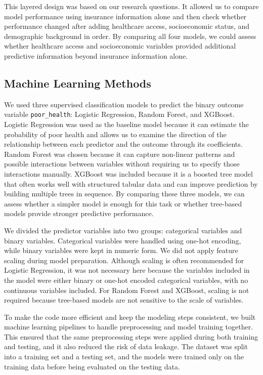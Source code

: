 This layered design was based on our research questions. It allowed us to compare model performance using insurance information alone and then check whether performance changed after adding healthcare access, socioeconomic status, and demographic background in order. By comparing all four models, we could assess whether healthcare access and socioeconomic variables provided additional predictive information beyond insurance information alone.

\subsection{Machine Learning Methods}
We used three supervised classification models to predict the binary outcome variable \texttt{poor\_health}: Logistic Regression, Random Forest, and XGBoost. Logistic Regression was used as the baseline model because it can estimate the probability of poor health and allows us to examine the direction of the relationship between each predictor and the outcome through its coefficients. Random Forest was chosen because it can capture non-linear patterns and possible interactions between variables without requiring us to specify those interactions manually. XGBoost was included because it is a boosted tree model that often works well with structured tabular data and can improve prediction by building multiple trees in sequence. By comparing these three models, we can assess whether a simpler model is enough for this task or whether tree-based models provide stronger predictive performance.

We divided the predictor variables into two groups: categorical variables and binary variables. Categorical variables were handled using one-hot encoding, while binary variables were kept in numeric form. We did not apply feature scaling during model preparation. Although scaling is often recommended for Logistic Regression, it was not necessary here because the variables included in the model were either binary or one-hot encoded categorical variables, with no continuous variables included. For Random Forest and XGBoost, scaling is not required because tree-based models are not sensitive to the scale of variables.

To make the code more efficient and keep the modeling steps consistent, we built machine learning pipelines to handle preprocessing and model training together. This ensured that the same preprocessing steps were applied during both training and testing, and it also reduced the risk of data leakage. The dataset was split into a training set and a testing set, and the models were trained only on the training data before being evaluated on the testing data.

